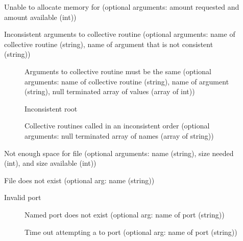 \begin{description}
\item[]Unable to allocate memory for
   (optional arguments: amount requested and amount
  available (int))
\item[]Inconsistent arguments to collective routine
(optional arguments: name of collective routine (string), name of argument
that is not consistent (string))
    \begin{description}
    \item[]Arguments to collective routine
      must be the same (optional arguments: name of collective routine
      (string), name of argument (string), null terminated array of values
      (array of int))
    \item[]Inconsistent root
    \item[]Collective routines
      called in an inconsistent order (optional arguments: null terminated
      array of names (array of string))
    \end{description}
\item[]Not enough space for file (optional
  arguments: name (string), size needed (int), and size available (int))
\item[]File does not exist (optional arg: name (string))
\item[]Invalid port
    \begin{description}
    \item[]Named port does not exist (optional
      arg: name of port (string))
    \item[]Time out attempting a
       to port (optional arg: name of port (string))

\end{description}
\end{description}
